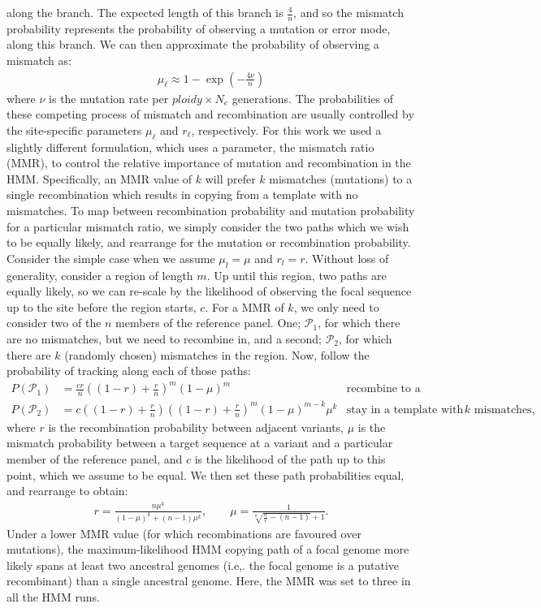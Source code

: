 \documentclass{article}
\begin{document}
along the branch. The expected length of this branch is $\frac{4}{n}$, and so the mismatch
probability represents the probability of observing a mutation or error mode,
along this branch. We can then approximate the probability of observing a mismatch as:
\begin{align}
    \mu_\ell \approx 1 - \exp{\left(-\frac{4\nu}{n}\right)}
\end{align}
where $\nu$ is the mutation rate per $\mathit{ploidy} \times N_e$ generations. The probabilities of these competing process of mismatch and recombination are usually controlled by the site-specific parameters $\mu_\ell$ and $r_\ell$, respectively.
For this work we used a slightly different formulation, which uses a parameter, the mismatch ratio (MMR), to control the relative importance of mutation
and recombination in the HMM. Specifically, an MMR value of $k$ will
prefer $k$ mismatches (mutations) to a single recombination which results in copying from a template with no mismatches.
To map between recombination probability and mutation probability for a particular mismatch
ratio, we simply consider the two paths which we wish to be equally likely, and rearrange
for the mutation or recombination probability. Consider the simple case when we assume
$\mu_l=\mu$ and $r_l=r$. Without loss of generality, consider a region of length $m$. Up
until this region, two paths are equally likely, so we can re-scale by the likelihood of
observing the focal sequence up to the site before the region starts, $c$. For a MMR of $k$,
we only need to consider two of the $n$ members of the reference panel. One;
$\mathcal{P}_1$, for which there are no mismatches, but we need to recombine in, and a
second; $\mathcal{P}_2$, for which there are $k$ (randomly chosen) mismatches in the region.
Now, follow the probability of tracking along each of those paths:
\begin{align*}
P(\mathcal{P}_1) &= \frac{cr}{n} \left(\left(1-r\right)+\frac{r}{n}\right)^m\left(1-\mu\right)^m &\text{recombine to a template with no mismatches,}\\
P(\mathcal{P}_2) &= c \left(\left(1-r\right) + \frac{r}{n}\right)\left(\left(1-r\right)+\frac{r}{n}\right)^m \left(1-\mu\right)^{m-k}\mu^k &\text{stay in a template with $k$ mismatches,}
\end{align*}
where $r$ is the recombination probability between adjacent variants, $\mu$ is the mismatch
probability between a target sequence at a variant and a particular member of the reference
panel, and $c$ is the likelihood of the path up to this point, which we assume to be equal.
We then set these path probabilities equal, and rearrange to obtain:
\begin{align*}
r = \frac{n\mu^k}{\left(1-\mu\right)^k + \left(n-1\right)\mu^k}, \quad\quad
\mu = \frac{1}{\sqrt[k]{\frac{n}{r} - (n-1)} + 1}.
\end{align*}
Under a lower MMR value (for which recombinations are favoured over mutations), the maximum-likelihood HMM copying path of a
focal genome more likely spans at least two ancestral genomes (i.e,. the focal
genome is a putative recombinant) than a single ancestral genome. Here, the MMR
was set to three in all the HMM runs.
\end{document}
